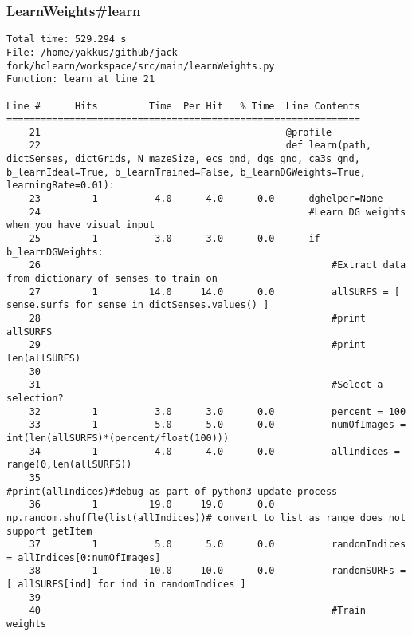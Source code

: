 \subsubsection{LearnWeights\#learn}
\begin{lstlisting}[xrightmargin=0.05\linewidth,caption=Line by line profiling of the learnWeights\#learn function (boltzmann probs as an eager function), label=profiling:line_learn]
Total time: 529.294 s
File: /home/yakkus/github/jack-fork/hclearn/workspace/src/main/learnWeights.py
Function: learn at line 21

Line #      Hits         Time  Per Hit   % Time  Line Contents
==============================================================
    21                                           @profile
    22                                           def learn(path, dictSenses, dictGrids, N_mazeSize, ecs_gnd, dgs_gnd, ca3s_gnd, b_learnIdeal=True, b_learnTrained=False, b_learnDGWeights=True, learningRate=0.01):
    23         1          4.0      4.0      0.0      dghelper=None
    24                                               #Learn DG weights when you have visual input
    25         1          3.0      3.0      0.0      if b_learnDGWeights:
    26                                                   #Extract data from dictionary of senses to train on 
    27         1         14.0     14.0      0.0          allSURFS = [ sense.surfs for sense in dictSenses.values() ]
    28                                                   #print allSURFS
    29                                                   #print len(allSURFS)
    30                                           
    31                                                   #Select a selection?
    32         1          3.0      3.0      0.0          percent = 100
    33         1          5.0      5.0      0.0          numOfImages = int(len(allSURFS)*(percent/float(100)))
    34         1          4.0      4.0      0.0          allIndices = range(0,len(allSURFS))
    35                                                   #print(allIndices)#debug as part of python3 update process
    36         1         19.0     19.0      0.0          np.random.shuffle(list(allIndices))# convert to list as range does not support getItem
    37         1          5.0      5.0      0.0          randomIndices = allIndices[0:numOfImages]
    38         1         10.0     10.0      0.0          randomSURFs = [ allSURFS[ind] for ind in randomIndices ] 
    39                                           
    40                                                   #Train weights

\end{lstlisting}
